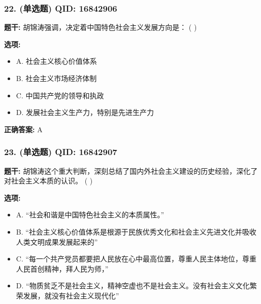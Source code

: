 \documentclass[12pt,UTF8]{ctexart}
\begin{document}
\vspace{0.3em}\hrulefill\vspace{0.7em}

\subsubsection*{22. (单选题) \small QID: 16842906}

\textbf{题干:}
胡锦涛强调，决定着中国特色社会主义发展方向是： ( )

\textbf{选项:}
\begin{itemize}[leftmargin=*]

  \item A. 社会主义核心价值体系

  \item B. 社会主义市场经济体制

  \item C. 中国共产党的领导和执政

  \item D. 发展社会主义生产力，特别是先进生产力

\end{itemize}

\textbf{正确答案:}
A

\vspace{0.3em}\hrulefill\vspace{0.7em}

\subsubsection*{23. (单选题) \small QID: 16842907}

\textbf{题干:}
胡锦涛这个重大判断，深刻总结了国内外社会主义建设的历史经验，深化了对社会主义本质的认识。 ( )

\textbf{选项:}
\begin{itemize}[leftmargin=*]

  \item A. “社会和谐是中国特色社会主义的本质属性。”

  \item B. “社会主义核心价值体系是根源于民族优秀文化和社会主义先进文化并吸收人类文明成果发展起来的”

  \item C. “每一个共产党员都要把人民放在心中最高位置，尊重人民主体地位，尊重人民首创精神，拜人民为师，”

  \item D. “物质贫乏不是社会主义，精神空虚也不是社会主义。没有社会主义文化繁荣发展，就没有社会主义现代化”

\end{itemize}
\end{document}
